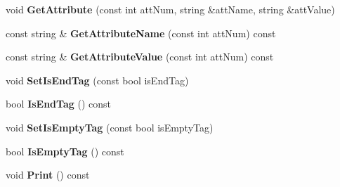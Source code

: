 \begin{DoxyCompactItemize}
\item 
\mbox{\label{class_obj_cryst_1_1_x_m_l_cryst_tag_a73ced51009c3f8754ee7b18d28b62340}} 
void {\bfseries Get\+Attribute} (const int att\+Num, string \&att\+Name, string \&att\+Value)
\item 
\mbox{\label{class_obj_cryst_1_1_x_m_l_cryst_tag_aeab5da42b50aa85394ae5e374dab0034}} 
const string \& {\bfseries Get\+Attribute\+Name} (const int att\+Num) const
\item 
\mbox{\label{class_obj_cryst_1_1_x_m_l_cryst_tag_a1704bae6227cc4ab5646181dba0fb355}} 
const string \& {\bfseries Get\+Attribute\+Value} (const int att\+Num) const
\item 
\mbox{\label{class_obj_cryst_1_1_x_m_l_cryst_tag_a8c7fd75290484b8525e956b31ef48261}} 
void {\bfseries Set\+Is\+End\+Tag} (const bool is\+End\+Tag)
\item 
\mbox{\label{class_obj_cryst_1_1_x_m_l_cryst_tag_a97dde36b1bf9bd893d2883a6f97b6dff}} 
bool {\bfseries Is\+End\+Tag} () const
\item 
\mbox{\label{class_obj_cryst_1_1_x_m_l_cryst_tag_a638dff0e517133f28702f774374f32c8}} 
void {\bfseries Set\+Is\+Empty\+Tag} (const bool is\+Empty\+Tag)
\item 
\mbox{\label{class_obj_cryst_1_1_x_m_l_cryst_tag_a69fb80898228c99fa5b3596f7710e1d3}} 
bool {\bfseries Is\+Empty\+Tag} () const
\item 
\mbox{\label{class_obj_cryst_1_1_x_m_l_cryst_tag_a29957432d2b42a6f045eab6707ff9b93}} 
void {\bfseries Print} () const
\end{DoxyCompactItemize}
